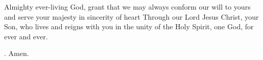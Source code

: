 \lettrine[lines=3]{A}{}lmighty ever-living God, grant that we may always conform our will to yours and serve your majesty in sincerity of heart Through our Lord Jesus Christ, your Son, who lives and reigns with you in the unity of the Holy Spirit, one God, for ever and ever. \par \Rbar. Amen.
